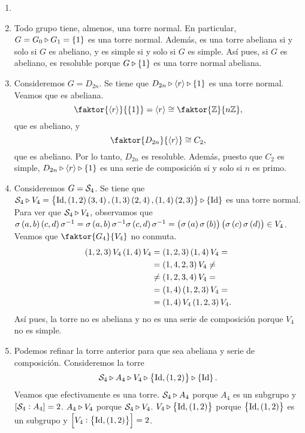 \begin{example}
    \begin{enumerate}[1.]
        \item[]
        \item Todo grupo tiene, almenos, una torre normal. En particular, $G=G_0\triangleright G_1=\left\{ 1\right\}$ es una torre normal. Además, es una torre abeliana si y solo si $G$ es abeliano, y es simple si y solo si $G$ es simple. Así pues, si $G$ es abeliano, es resoluble porque $G\triangleright \left\{ 1\right\}$ es una torre normal abeliana.
        \item Consideremos $G=D_{2n}$. Se tiene que $D_{2n}\triangleright \left<r\right> \triangleright\left\{ 1\right\}$ es una torre normal. Veamos que es abeliana.
            \[
                \faktor{\left< r\right>}{\lc 1\rc}=\left< r\right>\cong \faktor{\z}{n\z},
            \]
            que es abeliano, y
            \[
                \faktor{D_{2n}}{\left< r\right>}\cong C_2,
            \]
            que es abeliano. Por lo tanto, $D_{2n}$ es resoluble. Además, puesto que $C_2$ es simple, $D_{2n}\triangleright \left<r\right> \triangleright\left\{ 1\right\}$ es una serie de composición si y solo si $n$ es primo.
        \item Consideremos $G=\mathcal{S}_4$. Se tiene que $\mathcal{S}_4\triangleright V_4=\left\{ \operatorname{Id}, \left( 1, 2\right)\left( 3,4\right),\left( 1,3\right)\left( 2,4\right),\left( 1,4\right)\left( 2,3\right)\right\}\triangleright\left\{ \operatorname{Id}\right\}$ es una torre normal. Para ver que $\mathcal{S}_4\triangleright V_4$, observamos que $\sigma\left( a, b\right)\left( c, d\right)\sigma^{-1}=\sigma\left( a, b\right)\sigma^{-1}\sigma\left( c, d\right)\sigma^{-1}=\left(\sigma\left( a\right)\sigma\left( b\right)\right)\left(\sigma\left( c\right)\sigma\left( d\right)\right)\in V_4$. Veamos que $\faktor{G_4}{V_4}$ no conmuta.
        \begin{align*}
            \left( 1,2,3\right) V_4\left( 1,4\right) V_4 &= \left( 1,2,3\right)\left( 1,4\right) V_4 = \\
            &= \left( 1,4,2,3\right) V_4 \neq\\
            &\neq \left( 1,2,3,4\right) V_4 =\\
            &= \left( 1,4\right)\left( 1,2,3\right) V_4 = \\
            &= \left( 1,4\right) V_4\left( 1,2,3\right) V_4.
        \end{align*}
        Así pues, la torre no es abeliana y no es una serie de composición porque $V_4$ no es simple.
        \item Podemos refinar la torre anterior para que sea abeliana y serie de composición. Consideremos la torre
            \[
                \mathcal{S}_4\triangleright A_4 \triangleright V_4 \triangleright \left\{ \operatorname{Id}, \left( 1,2\right) \right\}\triangleright\left\{ \operatorname{Id}\right\}.
            \]
            Veamos que efectivamente es una torre. $\mathcal{S}_4\triangleright A_4$ porque $A_4$ es un subgrupo y $\left[ \mathcal{S}_4 : A_4\right]=2$. $A_4\triangleright V_4$ porque $\mathcal{S}_4\triangleright V_4$. $V_4\triangleright \left\{ \operatorname{Id}, \left( 1,2\right) \right\}$ porque $\left\{ \operatorname{Id}, \left( 1,2\right) \right\}$ es un subgrupo y $\left[ V_4 : \left\{ \operatorname{Id}, \left( 1,2\right) \right\}\right]=2$.
            

\end{enumerate}
\end{example}
